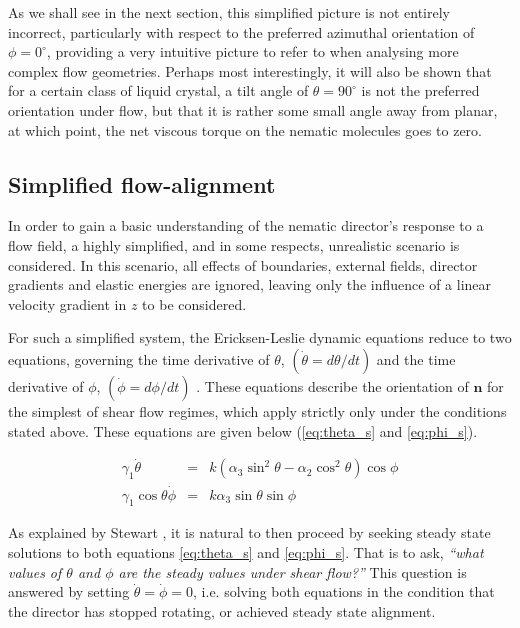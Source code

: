 As we shall see in the next section, this simplified picture is not entirely incorrect, particularly with respect to the preferred azimuthal orientation of $\phi=0^{\circ}$, providing a very intuitive picture to refer to when analysing more complex flow geometries. Perhaps most interestingly, it will also be shown that for a certain class of liquid crystal, a tilt angle of $\theta=90^{\circ}$ is not the preferred orientation under flow, but that it is rather some small angle away from planar, at which point, the net viscous torque on the nematic molecules goes to zero.

\subsection{Simplified flow-alignment}
In order to gain a basic understanding of the nematic director's response to a flow field, a highly simplified, and in some respects, unrealistic scenario is considered. In this scenario, all effects of boundaries, external fields, director gradients and elastic energies are ignored, leaving only the influence of a linear velocity gradient in $z$ to be considered.

For such a simplified system, the Ericksen-Leslie dynamic equations reduce to two equations, governing the time derivative of $\theta$, $\left(\dot{\theta}=d\theta/dt\right)$ and the time derivative of $\phi$, $\left(\dot{\phi}=d\phi/dt\right)$ \cite{Stewart2004}. These equations describe the orientation of $\mathbf{n}$ for the simplest of shear flow regimes, which apply strictly only under the conditions stated above. These equations are given below (\ref{eq:theta_s} and \ref{eq:phi_s}).

\begin{eqnarray}
\gamma_1\dot{\theta}&=&k\left(\alpha_3\sin^2\theta-\alpha_2\cos^2\theta\right)\cos\phi\label{eq:theta_s}\\
\gamma_1\cos\theta\dot{\phi}&=&k\alpha_3\sin\theta\sin\phi\label{eq:phi_s}
\end{eqnarray}

\noindent As explained by Stewart \cite{Stewart2004}, it is natural to then proceed by seeking steady state solutions to both equations \ref{eq:theta_s} and \ref{eq:phi_s}. That is to ask, \textit{``what values of $\theta$ and $\phi$ are the steady values under shear flow?''} This question is answered by setting $\dot{\theta}=\dot{\phi}=0$, i.e. solving both equations in the condition that the director has stopped rotating, or achieved steady state alignment.

